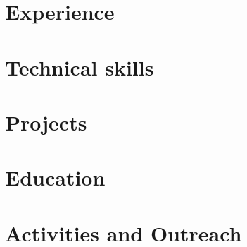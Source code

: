\documentclass[10pt]{article}
\begin{document}
\section{Experience}


\section{Technical skills}


\section{Projects}


\section{Education}


\section{Activities and Outreach}

\end{document}
